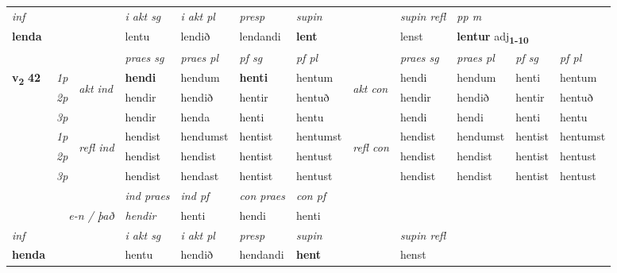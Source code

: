 \begin{longtable}[l]{X>{\footnotesize\itshape}llXXXXlXXXX}
\cmidrule{4-7}
   {\textit{inf}} & &  & \textit{i akt sg} & \textit{i akt pl}   & \textit{presp} & \textit{supin} && \textit{supin refl} & \textit{pp m} \\*
  {\textbf{lenda}} & && lentu  & lendið   & lendandi &  \textbf{lent} && lenst & \multicolumn{2}{l}{\textbf{lentur} adj\textbf{\textsubscript{1-10}}} \\*

\midrule

 & &   & \textit{praes sg}  & \textit{praes pl}    & \textit{ pf sg} & \textit{pf pl} & & \textit{praes sg}  & \textit{praes pl}    & \textit{pf sg} & \textit{pf pl }  \\ \cmidrule{4-7} \cmidrule{9-12}
 \multirow{2}{*}{{{\textbf{v{\textsubscript{2}}} \Large{\textbf{42}}}}}  & 1p & \multirow{3}{*}{\begin{turn}{90}\textit{akt ind}\end{turn}} & \textbf{hendi} & hendum & \textbf{henti} & hentum & \multirow{3}{*}{\begin{turn}{90}\textit{akt con}\end{turn}} &hendi & hendum & henti & hentum\\*
 & 2p &  &  hendir  & hendið & hentir & hentuð & & hendir & hendið & hentir & hentuð \\*
 & 3p &  & hendir & henda & henti & hentu & & hendi & hendi& henti & hentu \\*
\cmidrule{4-7} \cmidrule{9-12}
 & 1p & \multirow{3}{*}{\begin{turn}{90}\textit{refl ind}\end{turn}}  & hendist & hendumst & hentist & hentumst & \multirow{3}{*}{\begin{turn}{90}\textit{refl con}\end{turn}}  &hendist & hendumst & hentist & hentumst \\*
 & 2p &  & hendist & hendist & hentist & hentust & &hendist & hendist & hentist & hentust \\*
 & 3p  & & hendist & hendast & hentist & hentust & & hendist & hendist& hentist & hentust \\*
\cmidrule{4-7} \cmidrule{9-12}

   && &  \textit{ind praes} & \textit{ind pf} & \textit{con praes} & \textit{con pf} \\*
\multicolumn{3}{r}{\textit{e-n / það}} & hendir & henti & hendi & henti \\*

\cmidrule{4-7}
   {\textit{inf}} & &  & \textit{i akt sg} & \textit{i akt pl}   & \textit{presp} & \textit{supin} && \textit{supin refl}  \\*
  {\textbf{henda}} & && hentu  & hendið   & hendandi &  \textbf{hent} && henst  \\*


\end{longtable}
